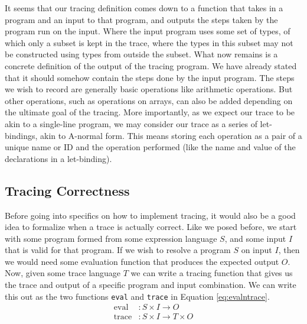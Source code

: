     It seems that our tracing definition comes down to a function that takes in a program and an input to that program, and outputs the steps taken by the program run on the input.
    Where the input program uses some set of types, of which only a subset is kept in the trace, where the types in this subset may not be constructed using types from outside the subset.
    What now remains is a concrete definition of the output of the tracing program.
    We have already stated that it should somehow contain the steps done by the input program.
    The steps we wish to record are generally basic operations like arithmetic operations.
    But other operations, such as operations on arrays, can also be added depending on the ultimate goal of the tracing.
    More importantly, as we expect our trace to be akin to a single-line program, we may consider our trace as a series of let-bindings, akin to A-normal form.
    This means storing each operation as a pair of a unique name or ID and the operation performed (like the name and value of the declarations in a let-binding).
    
    \subsection{Tracing Correctness} \label{sec:correctness}
        Before going into specifics on how to implement tracing, it would also be a good idea to formalize when a trace is actually correct.
        Like we posed before, we start with some program formed from some expression language $S$, and some input $I$ that is valid for that program.
        If we wish to resolve a program $S$ on input $I$, then we would need some evaluation function that produces the expected output $O$.
        Now, given some trace language $T$ we can write a tracing function that gives us the trace and output of a specific program and input combination.
        We can write this out as the two functions \texttt{eval} and \texttt{trace} in Equation \ref{eq:evalntrace}.
        \begin{equation}
            \begin{aligned}
                \text{eval}&:S\times I\to O\\
                \text{trace}&:S\times I\to T\times O
            \end{aligned}
            \label{eq:evalntrace}
        \end{equation}

